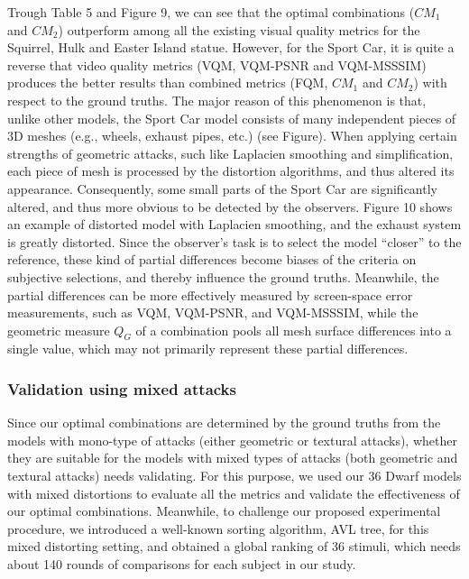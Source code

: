 Trough Table 5 and Figure 9, we can see that the optimal combinations ($CM_1$ and $CM_2$) outperform among all the existing visual quality metrics for the Squirrel, Hulk and Easter Island statue. However, for the Sport Car, it is quite a reverse that video quality metrics (VQM, VQM-PSNR and VQM-MSSSIM) produces the better results than combined metrics (FQM, $CM_1$ and $CM_2$) with respect to the ground truths. The major reason of this phenomenon is that, unlike other models, the Sport Car model consists of many independent pieces of 3D meshes (e.g., wheels, exhaust pipes, etc.) (see Figure). When applying certain strengths of geometric attacks, such like Laplacien smoothing and simplification, each piece of mesh is processed by the distortion algorithms, and thus altered its appearance. Consequently, some small parts of the Sport Car are significantly altered, and thus more obvious to be detected by the observers. Figure 10 shows an example of distorted model with Laplacien smoothing, and the exhaust system is greatly distorted. Since the observer’s task is to select the model “closer” to the reference, these kind of partial differences become biases of the criteria on subjective selections, and thereby influence the ground truths. Meanwhile, the partial differences can be more effectively measured by screen-space error measurements, such as VQM, VQM-PSNR, and VQM-MSSSIM, while the geometric measure $Q_G$ of a combination pools all mesh surface differences into a single value, which may not primarily represent these partial differences.\\
\subsubsection{Validation using mixed attacks}
Since our optimal combinations are determined by the ground truths from the models with mono-type of attacks (either geometric or textural attacks), whether they are suitable for the models with mixed types of attacks (both geometric and textural attacks) needs validating. For this purpose, we used our 36 Dwarf models with mixed distortions to evaluate all the metrics and validate the effectiveness of our optimal combinations. Meanwhile, to challenge our proposed experimental procedure, we introduced a well-known sorting algorithm, AVL tree, for this mixed distorting setting, and obtained a global ranking of 36 stimuli, which needs about 140 rounds of comparisons for each subject in our study.
